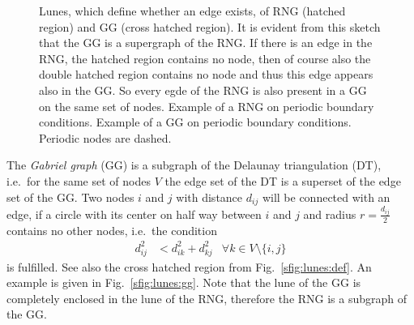     \begin{figure}[htbp]
        \centering
        \caption[Gabriel and Relative Neighborhood Graph]
        {
             Lunes, which define whether an edge
                exists, of RNG (hatched region) and GG (cross hatched region).
                It is evident from this sketch that the GG is a supergraph
                of the RNG. If there is an edge in the RNG, the hatched
                region contains no node, then of course also the double
                hatched region contains no node and thus this edge appears
                also in the GG. So every egde of the RNG is also present
                in a GG on the same set of nodes.
             Example of a RNG on periodic
                boundary conditions.
             Example of a GG on
                periodic boundary conditions. Periodic nodes are dashed.
        }
        \label{fig:lunes}
    \end{figure}

    The \emph{Gabriel graph} (GG) \cite{Gabriel1969} is a subgraph
    of the Delaunay triangulation \cite{Delaunay1934,Katajainen}
    (DT), i.e.~for the same set of nodes \(V\) the edge set of the
    DT is a superset of the edge set of the GG. Two nodes \(i\) and
    \(j\) with distance \(d_{ij}\) will be connected with an edge,
    if a circle with its center on half way between \(i\) and \(j\)
    and radius \(r = \frac{d_{ij}}{2}\) contains no other nodes, i.e.~the
    condition
    \begin{align*}
        d^{2}_{ij} &< d^{2}_{ik} + d^{2}_{kj} &\forall k \in V\setminus\{i,j\}
    \end{align*}
    is fulfilled. See
    also the cross hatched region from Fig.~\ref{sfig:lunes:def}. An
    example is given in Fig.~\ref {sfig:lunes:gg}. Note that the
    lune of the GG is completely enclosed in the lune of the RNG,
    therefore the RNG is a subgraph of the GG.

